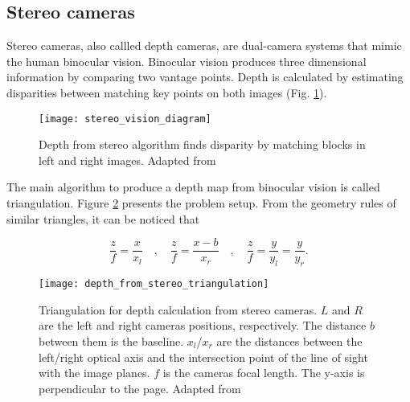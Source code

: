 

\subsection{Stereo cameras}
\label{subsec:stereo_cameras}

Stereo cameras, also callled depth cameras, are dual-camera systems that mimic the human binocular vision. Binocular vision produces three dimensional information by comparing two vantage points. Depth is calculated by estimating disparities between matching key points on both images (Fig. \ref{fig:stereo_vision_diagram}).\\

\begin{figure}[htbp]
	\centering
	\texttt{[image: stereo\_vision\_diagram]}
	\caption{Depth from stereo algorithm finds disparity by matching blocks in left and right images. Adapted from \cite{IntelRealSense_basics_depth_vision}}
	\label{fig:stereo_vision_diagram}
\end{figure}

The main algorithm to produce a depth map from binocular vision is called triangulation. Figure \ref{fig:depth_from_stereo_triangulation} presents the problem setup. From the geometry rules of similar triangles, it can be noticed that

\begin{equation}
    \label{eq:stereo_vision_triangulation_equations}
    \frac{z}{f} = \frac{x}{x_l} \quad,\quad \frac{z}{f} = \frac{x-b}{x_r} \quad,\quad \frac{z}{f} = \frac{y}{y_l} = \frac{y}{y_r}.
\end{equation}

\begin{figure}[htbp]
	\centering
	\texttt{[image: depth\_from\_stereo\_triangulation]}
	\caption{Triangulation for depth calculation from stereo cameras. $L$ and $R$ are the left and right cameras positions, respectively. The distance $b$ between them is the baseline. $x_l$/$x_r$ are the distances between the left/right optical axis and the intersection point of the line of sight with the image planes. $f$ is the cameras focal length. The y-axis is perpendicular to the page. Adapted from \cite{Rao2009_stereo_3d_vision}}
	\label{fig:depth_from_stereo_triangulation}
\end{figure}


